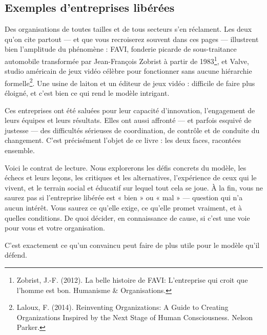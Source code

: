 \subsection*{Exemples d'entreprises libérées}

Des organisations de toutes tailles et de tous secteurs s'en réclament. Les deux qu'on cite partout — et que vous recroiserez souvent dans ces pages — illustrent bien l'amplitude du phénomène : FAVI, fonderie picarde de sous-traitance automobile transformée par Jean-François Zobrist à partir de 1983\footnote{Zobrist, J.-F. (2012). La belle histoire de FAVI: L'entreprise qui croit que l'homme est bon. Humanisme \& Organisations.}, et Valve, studio américain de jeux vidéo célèbre pour fonctionner sans aucune hiérarchie formelle\footnote{Laloux, F. (2014). Reinventing Organizations: A Guide to Creating Organizations Inspired by the Next Stage of Human Consciousness. Nelson Parker.}. Une usine de laiton et un éditeur de jeux vidéo : difficile de faire plus éloigné, et c'est bien ce qui rend le modèle intrigant.

Ces entreprises ont été saluées pour leur capacité d'innovation, l'engagement de leurs équipes et leurs résultats. Elles ont aussi affronté — et parfois esquivé de justesse — des difficultés sérieuses de coordination, de contrôle et de conduite du changement. C'est précisément l'objet de ce livre : les deux faces, racontées ensemble.

Voici le contrat de lecture. Nous explorerons les défis concrets du modèle, les échecs et leurs leçons, les critiques et les alternatives, l'expérience de ceux qui le vivent, et le terrain social et éducatif sur lequel tout cela se joue. À la fin, vous ne saurez pas si l'entreprise libérée est « bien » ou « mal » — question qui n'a aucun intérêt. Vous saurez ce qu'elle exige, ce qu'elle promet vraiment, et à quelles conditions. De quoi décider, en connaissance de cause, si c'est une voie pour vous et votre organisation.

C'est exactement ce qu'un convaincu peut faire de plus utile pour le modèle qu'il défend.

